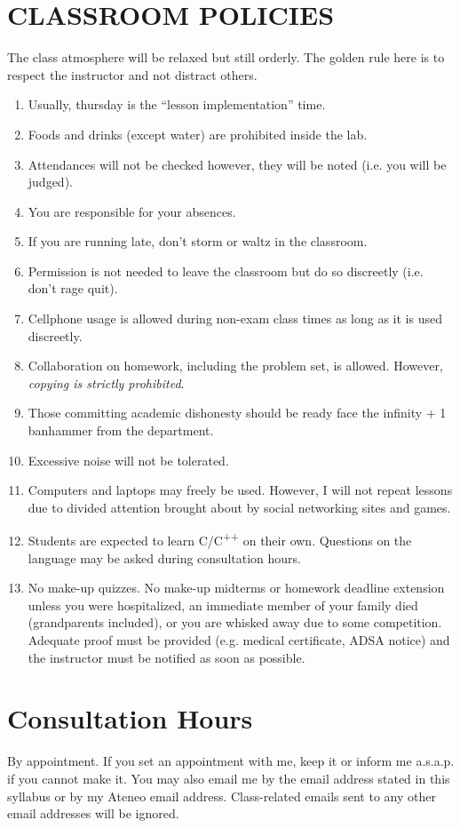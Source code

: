 \documentclass[10pt]{article}
\begin{document}
\section{CLASSROOM POLICIES}
The class atmosphere will be relaxed but still orderly. The golden rule here is to respect the instructor and not distract others.
\begin{enumerate}[noitemsep]
\item Usually, thursday is the ``lesson implementation'' time.
\item Foods and drinks (except water) are prohibited inside the lab.
\item Attendances will not be checked however, they will be noted (i.e. you will be judged).
\item You are responsible for your absences.
\item If you are running late, don't storm or waltz in the classroom.
\item Permission is not needed to leave the classroom but do so discreetly (i.e. don't rage quit).
\item Cellphone usage is allowed during non-exam class times as long as it is used discreetly.
\item Collaboration on homework, including the problem set, is allowed. However, \emph{copying is strictly prohibited}.
\item Those committing academic dishonesty should be ready face the infinity + 1 banhammer from the department.
\item Excessive noise will not be tolerated.
\item Computers and laptops may freely be used. However, I will not repeat lessons due to divided attention brought about by social networking sites and games.
\item Students are expected to learn C/C\textsuperscript{++} on their own. Questions on the language may be asked during consultation hours.
\item No make-up quizzes. No make-up midterms or homework deadline extension unless you were hospitalized, an immediate member of your family died (grandparents included), or you are whisked away due to some competition. Adequate proof must be provided (e.g. medical certificate, ADSA notice) and the instructor must be notified as soon as possible.
\end{enumerate}

\section{Consultation Hours}
By appointment. If you set an appointment with me, keep it or inform me a.s.a.p. if you cannot make it. You may also email me by the email address stated in this syllabus or by my Ateneo email address. Class-related emails sent to any other email addresses will be ignored.
\end{document}
